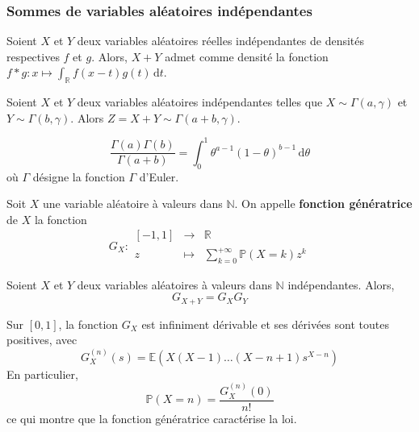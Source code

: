 	\subsubsection{Sommes de variables aléatoires indépendantes}
	
	
	\begin{theorem}
		Soient $X$ et $Y$ deux variables aléatoires réelles indépendantes de densités respectives $f$ et $g$. Alors, $X + Y$ admet comme densité la fonction $f * g : x \mapsto \int_{\mathbb{R}} f(x-t) g(t) \, \mathrm{d}t$.
	\end{theorem}
	
	\begin{application}
		Soient $X$ et $Y$ deux variables aléatoires indépendantes telles que $X \sim \Gamma(a, \gamma)$ et $Y \sim \Gamma(b, \gamma)$. Alors $Z = X + Y \sim \Gamma(a+b, \gamma)$.
	\end{application}
	
	\begin{application}
		\[ \frac{\Gamma(a) \Gamma(b)}{\Gamma(a+b)} = \int_0^1 \theta^{a-1} (1-\theta)^{b-1} \, \mathrm{d}\theta \]
		où $\Gamma$ désigne la fonction $\Gamma$ d'Euler.
	\end{application}
	
	
	\begin{definition}
		Soit $X$ une variable aléatoire à valeurs dans $\mathbb{N}$. On appelle \textbf{fonction génératrice} de $X$ la fonction
		\[
		G_X :
		\begin{array}{ccc}
			[-1,1] &\rightarrow& \mathbb{R} \\
			z &\mapsto& \sum_{k=0}^{+\infty} \mathbb{P}(X=k) z^k
		\end{array}
		\]
	\end{definition}
	
	\begin{proposition}
		Soient $X$ et $Y$ deux variables aléatoires à valeurs dans $\mathbb{N}$ indépendantes. Alors,
		\[ G_{X+Y} = G_X G_Y \]
	\end{proposition}
	
	\begin{theorem}
		Sur $[0,1]$, la fonction $G_X$ est infiniment dérivable et ses dérivées sont toutes positives, avec
		\[ G_X^{(n)}(s) = \mathbb{E}(X(X-1) \dots (X-n+1)s^{X-n}) \]
		En particulier,
		\[ \mathbb{P}(X=n) = \frac{G_X^{(n)}(0)}{n!} \]
		ce qui montre que la fonction génératrice caractérise la loi.
	\end{theorem}
	
